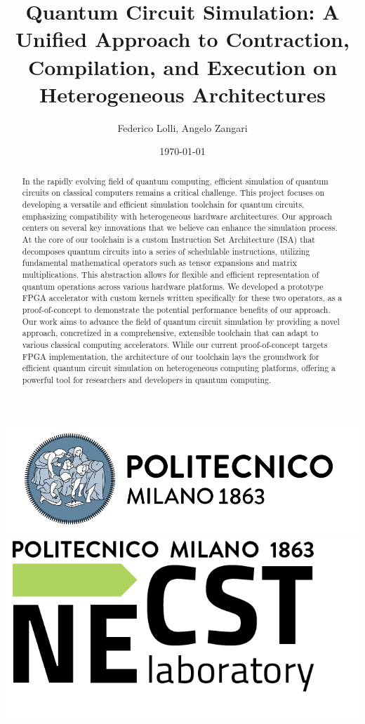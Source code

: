 \documentclass[12pt,oneside,a4paper]{article}
\title{\textbf{Quantum Circuit Simulation: A Unified Approach to Contraction, Compilation, and Execution on Heterogeneous Architectures}}
\author{Federico Lolli, Angelo Zangari}
\date{\today}
\begin{document}
\begin{titlepage}
    \centering
    \clearpage
    \maketitle
	\thispagestyle{empty}
	\vspace*{1cm}
	\vfill
	\centering
	\includegraphics{logo_polimi.png}\includegraphics{logo_NECST.png}
\end{titlepage}


\begin{abstract}
    In the rapidly evolving field of quantum computing, efficient simulation of quantum circuits on classical computers remains a critical challenge. This project focuses on developing a versatile and efficient simulation toolchain for quantum circuits, emphasizing compatibility with heterogeneous hardware architectures. Our approach centers on several key innovations that we believe can enhance the simulation process. At the core of our toolchain is a custom Instruction Set Architecture (ISA) that decomposes quantum circuits into a series of schedulable instructions, utilizing fundamental mathematical operators such as tensor expansions and matrix multiplications. This abstraction allows for flexible and efficient representation of quantum operations across various hardware platforms.
    We developed a prototype FPGA accelerator with custom kernels written specifically for these two operators, as a proof-of-concept to demonstrate the potential performance benefits of our approach. Our work aims to advance the field of quantum circuit simulation by providing a novel approach, concretized in a comprehensive, extensible toolchain that can adapt to various classical computing accelerators. While our current proof-of-concept targets FPGA implementation, the architecture of our toolchain lays the groundwork for efficient quantum circuit simulation on heterogeneous computing platforms, offering a powerful tool for researchers and developers in quantum computing.
\end{abstract}
\end{document}
